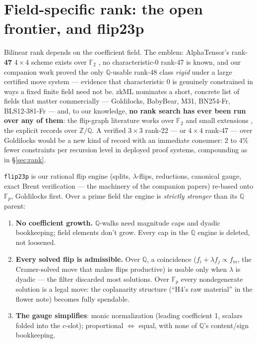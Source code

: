\documentclass[10pt]{article}
\begin{document}
\section{Field-specific rank: the open frontier, and
  flip23p}\label{sec:engine}

Bilinear rank depends on the coefficient field. The emblem:
AlphaTensor's rank-\textbf{47} $4\times4$ scheme exists over
$\mathbb{F}_2$ \cite{alphatensor}, no characteristic-0 rank-47 is
known, and our companion work proved the only $\mathbb{Q}$-usable
rank-48 class \emph{rigid} under a large certified move system ---
evidence that characteristic 0 is genuinely constrained in ways a
fixed finite field need not be. zkML nominates a short, concrete
list of fields that matter commercially --- Goldilocks, BabyBear,
M31, BN254-Fr, BLS12-381-Fr --- and, to our knowledge, \textbf{no
rank search has ever been run over any of them}: the flip-graph
literature works over $\mathbb{F}_2$ and small extensions
\cite{km}, the explicit records over $\mathbb{Z}/\mathbb{Q}$. A
verified $3\times3$ rank-22 --- or $4\times4$ rank-47 --- over
Goldilocks would be a new kind of record with an immediate consumer:
2 to 4\% fewer constraints per recursion level in deployed proof
systems, compounding as in \S\ref{sec:rank}.

\texttt{flip23p} is our rational flip engine (splits,
$\lambda$-flips, reductions, canonical gauge, exact Brent
verification --- the machinery of the companion papers) re-based
onto $\mathbb{F}_p$, Goldilocks first. Over a prime field the engine
is \emph{strictly stronger} than its $\mathbb{Q}$ parent:
\begin{enumerate}
\item \textbf{No coefficient growth.} $\mathbb{Q}$-walks need
  magnitude caps and dyadic bookkeeping; field elements don't grow.
  Every cap in the $\mathbb{Q}$ engine is deleted, not loosened.
\item \textbf{Every solved flip is admissible.} Over $\mathbb{Q}$, a
  coincidence ($f_i + \lambda f_j \propto f_m$, the Cramer-solved
  move that makes flips productive) is usable only when $\lambda$ is
  dyadic --- the filter discarded most solutions. Over $\mathbb{F}_p$
  every nondegenerate solution is a legal move: the coplanarity
  structure (``H4's raw material'' in the flower note) becomes fully
  spendable.
\item \textbf{The gauge simplifies}: monic normalization (leading
  coefficient 1, scalars folded into the $c$-slot); proportional
  $\Leftrightarrow$ equal, with none of $\mathbb{Q}$'s content/sign
  bookkeeping.
\end{enumerate}
\end{document}
